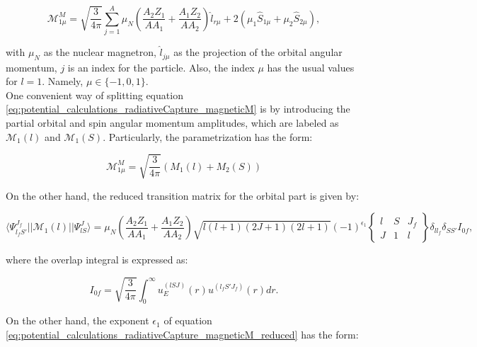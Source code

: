 \documentclass[openany]{book}
\begin{document}
\begin{equation}\label{eq:potential_calculations_radiativeCapture_magneticM}
	\mathcal{M}^{M}_{1\mu} = \sqrt{\frac{3}{4\pi}} \sum_{j=1}^{A}{\mu_N \left(\frac{A_2Z_1}{AA_1} + \frac{A_1Z_2}{AA_2}\right) \hat l _{r \mu} + 2(\mu_1\hat S_{1\mu} + \mu_2\hat S_{2\mu})},
\end{equation}

with $\mu_N$ as the nuclear magnetron, $\hat l_{j\mu}$ as the projection of the orbital angular momentum, $j$ is an index for the particle. Also, the index $\mu$ has the usual values for $l=1$. Namely, $\mu \in \{-1, 0, 1\}$. \\

One convenient way of splitting equation \ref{eq:potential_calculations_radiativeCapture_magneticM} is by introducing the partial orbital and spin angular momentum amplitudes, which are labeled as $\mathcal{M}_1(l)$ and $\mathcal{M}_1(S)$. Particularly, the parametrization has the form: 

\begin{equation}\label{eq:potential_calculations_radiativeCapture_magneticM_simplified}
	\mathcal{M}^{M}_{1\mu} = \sqrt{\frac{3}{4\pi}}(M_1(l) + M_2(S))
\end{equation}

On the other hand, the reduced transition matrix for the orbital part is given by: 

\begin{equation}\label{eq:potential_calculations_radiativeCapture_magneticM_reduced}
	\langle \Psi^{J_f}_{l_fS'}  ||  \mathcal{M}_1(l) ||  \Psi^{J}_{lS} \rangle = \mu_N \left( \frac{A_2Z_1}{AA_1} + \frac{A_1Z_2}{AA_2} \right) \sqrt{l(l+1)(2J + 1)(2l + 1)} (-1)^{\epsilon_1} \left \{ \begin{matrix}
		l & S & J_f \\
		J & 1 & l
	\end{matrix} \right \} \delta_{ll_f} \delta_{SS'} I_{0f},
\end{equation}

where the overlap integral is expressed as:

\begin{equation}\label{eq:potential_calculations_radiativeCapture_magneticM_overlapIntegral}
	I_{0f} = \sqrt{\frac{3}{4\pi}} \int_{0}^{\infty} {u^{(lSJ)}_E (r)u^{(l_fS'J_f)}(r)dr}.
\end{equation}

On the other hand, the exponent $\epsilon_1$ of equation \ref{eq:potential_calculations_radiativeCapture_magneticM_reduced} has the form: 
\end{document}
